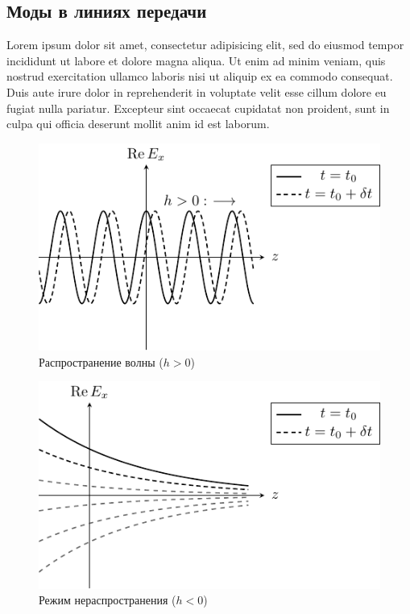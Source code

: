 \subsection{Моды в линиях передачи}

Lorem ipsum dolor sit amet, consectetur adipisicing elit, sed do eiusmod
tempor incididunt ut labore et dolore magna aliqua. Ut enim ad minim veniam,
quis nostrud exercitation ullamco laboris nisi ut aliquip ex ea commodo
consequat. Duis aute irure dolor in reprehenderit in voluptate velit esse
cillum dolore eu fugiat nulla pariatur. Excepteur sint occaecat cupidatat non
proident, sunt in culpa qui officia deserunt mollit anim id est laborum.

\begin{figure}[H]
	\centering
	\includegraphics[scale=1.5]{img/lect3_ris1}
	\caption{Распространение волны ($h>0$)}
	\label{fig:lect3:1}
\end{figure}

\begin{figure}[H]
	\centering
	\includegraphics[scale=1.5]{img/lect3_ris2}
	\caption{Режим нераспространения ($h<0$)}
	\label{fig:lect3:2}
\end{figure}


